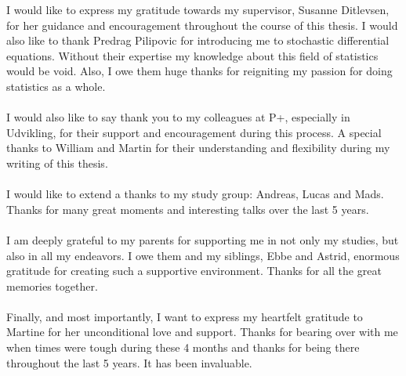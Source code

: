 I would like to express my gratitude towards my supervisor, Susanne Ditlevsen, for her guidance and encouragement throughout the course of this thesis. I would also like to thank Predrag Pilipovic for introducing me to stochastic differential equations. Without their expertise my knowledge about this field of statistics would be void. Also, I owe them huge thanks for reigniting my passion for doing statistics as a whole.\\\\
I would also like to say thank you to my colleagues at P+, especially in Udvikling, for their support and encouragement during this process. A special thanks to William and Martin for their understanding and flexibility during my writing of this thesis.\\\\
I would like to extend a thanks to my study group: Andreas, Lucas and Mads. Thanks for many great moments and interesting talks over the last 5 years. \\\\
I am deeply grateful to my parents for supporting me in not only my studies, but also in all my endeavors. I owe them and my siblings, Ebbe and Astrid, enormous gratitude for creating such a supportive environment. Thanks for all the great memories together.\\\\
Finally, and most importantly, I want to express my heartfelt gratitude to Martine for her unconditional love and support. Thanks for bearing over with me when times were tough during these 4 months and thanks for being there throughout the last 5 years. It has been invaluable. 